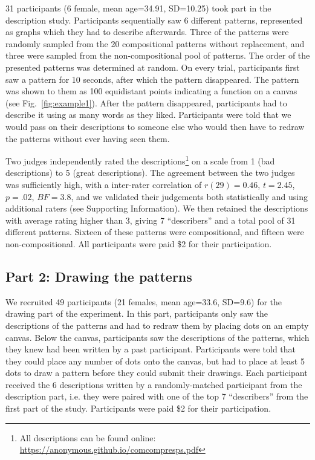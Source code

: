 \documentclass[a4paper,man, floatsintext, natbib]{apa6}
\begin{document}
31 participants (6 female, mean age=34.91, SD=10.25) took part in the description study. Participants sequentially saw 6 different patterns, represented as graphs which they had to describe afterwards. Three of the patterns were randomly sampled from the 20 compositional patterns without replacement, and three were sampled from the non-compositional pool of patterns. The order of the presented patterns was determined at random. On every trial, participants first saw a pattern for 10 seconds, after which the pattern disappeared. The pattern was shown to them as 100 equidistant points indicating a function on a canvas (see Fig.~\ref{fig:example1}). After the pattern disappeared, participants had to describe it using as many words as they liked. Participants were told that we would pass on their descriptions to someone else who would then have to redraw the patterns without ever having seen them.

Two judges independently rated the descriptions\footnote{All descriptions can be found online: \url{https://anonymous.github.io/comcompresps.pdf}} on a scale from 1 (bad descriptions) to 5 (great descriptions). The agreement between the two judges was sufficiently high, with a inter-rater correlation of $r(29)=0.46$, $t=2.45$, $p=.02$, $BF=3.8$, and we validated their judgements both statistically and using additional raters (see Supporting Information). We then retained the descriptions with average rating higher than 3, giving 7 ``describers'' and a total pool of 31 different patterns. Sixteen of these patterns were compositional, and fifteen were non-compositional. All participants were paid \$2 for their participation.

\subsection{Part 2: Drawing the patterns}

We recruited 49 participants (21 females, mean age=33.6, SD=9.6) for the drawing part of the experiment. In this part, participants only saw the descriptions of the patterns and had to redraw them by placing dots on an empty canvas. Below the canvas, participants saw the descriptions of the patterns, which they knew had been written by a past participant. Participants were told that they could place any number of dots onto the canvas, but had to place at least 5 dots to draw a pattern before they could submit their drawings. Each participant received the 6 descriptions written by a randomly-matched participant from the description part, i.e. they were paired with one of the top 7 ``describers'' from the first part of the study. Participants were paid \$2 for their participation.
\end{document}
